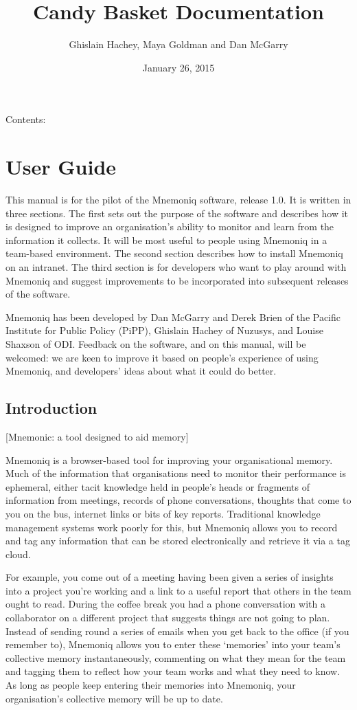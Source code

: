 \documentclass[letterpaper,10pt,english]{sphinxmanual}
\title{Candy Basket Documentation}
\date{January 26, 2015}
\author{Ghislain Hachey, Maya Goldman and Dan McGarry}
\begin{document}
\maketitle
\tableofcontents
{}\label{index::doc}


Contents:


\chapter{User Guide}
\label{user-guide:user-guide}\label{user-guide:candy-basket-s-documentation}\label{user-guide::doc}
This manual is for the pilot of the Mnemoniq software, release 1.0.
It is written in three sections.  The first sets out the purpose of
the software and describes how it is designed to improve an
organisation's ability to monitor and learn from the information it
collects.  It will be most useful to people using Mnemoniq in a
team-based environment.  The second section describes how to install
Mnemoniq on an intranet.  The third section is for developers who want
to play around with Mnemoniq and suggest improvements to be
incorporated into subsequent releases of the software.

Mnemoniq has been developed by Dan McGarry and Derek Brien of the
Pacific Institute for Public Policy (PiPP), Ghislain Hachey of
Nuzusys, and Louise Shaxson of ODI.  Feedback on the software, and on
this manual, will be welcomed: we are keen to improve it based on
people's experience of using Mnemoniq, and developers' ideas about
what it could do better.


\section{Introduction}
\label{user-guide:introduction}
{[}Mnemonic: a tool designed to aid memory{]}

Mnemoniq is a browser-based tool for improving your organisational
memory. Much of the information that organisations need to monitor
their performance is ephemeral, either tacit knowledge held in
people's heads or fragments of information from meetings, records of
phone conversations, thoughts that come to you on the bus, internet
links or bits of key reports.  Traditional knowledge management
systems work poorly for this, but Mnemoniq allows you to record and
tag any information that can be stored electronically and retrieve it
via a tag cloud.

For example, you come out of a meeting having been given a series of
insights into a project you're working and a link to a useful report
that others in the team ought to read. During the coffee break you had
a phone conversation with a collaborator on a different project that
suggests things are not going to plan.  Instead of sending round a
series of emails when you get back to the office (if you remember to),
Mnemoniq allows you to enter these `memories' into your team's
collective memory instantaneously, commenting on what they mean for
the team and tagging them to reflect how your team works and what they
need to know.  As long as people keep entering their memories into
Mnemoniq, your organisation's collective memory will be up to date.
\end{document}

